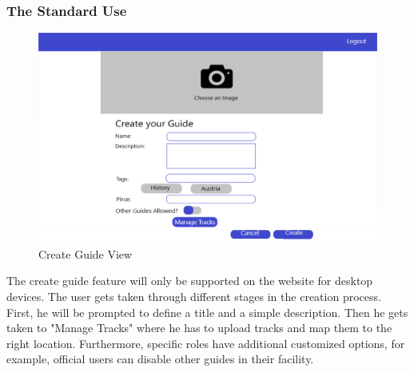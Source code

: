 \documentclass[12pt]{article}
\theoremstyle{definition}
\newenvironment{text}{
   \setlength{\parindent}{0pt}
   \color{black}
}{}
\begin{document}
    \subsubsection{The Standard Use}
    \begin{figure}[hbt!]
        \label{fig:create_guide}
        \centering
        \includegraphics[width=1\linewidth]{UIs/CreateGuideWeb.PNG}
        \caption{Create Guide View}
    \end{figure}
    \begin{text}
    The create guide feature will only be supported on the website for desktop devices.
    The user gets taken through different stages in the creation process. 
    First, he will be prompted to define a title and a simple description. Then he gets taken to  
    "Manage Tracks" where he has to upload tracks and map them to the right location.
    Furthermore, specific roles have additional customized options, for example, official users can disable other guides in their facility.
    \end{text}
\end{document}
